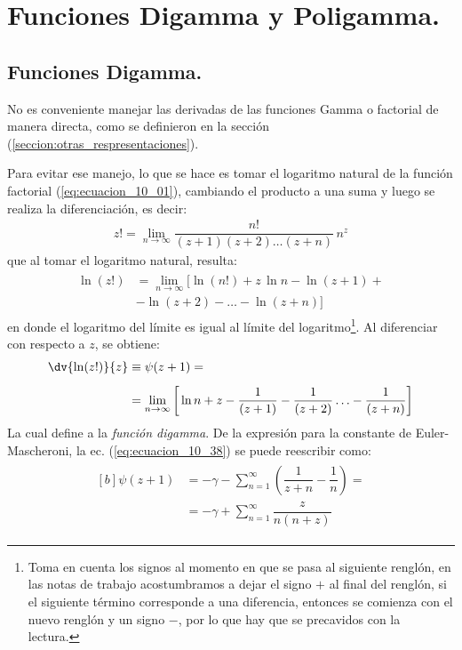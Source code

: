 \section{Funciones Digamma y Poligamma.}

\subsection{Funciones Digamma.}

No es conveniente manejar las derivadas de las funciones Gamma o factorial de manera directa, como se definieron en la sección (\ref{seccion:otras_respresentaciones}).
\par
Para evitar ese manejo, lo que se hace es tomar el logaritmo natural de la función factorial (\ref{eq:ecuacion_10_01}), cambiando el producto a una suma y luego se realiza la diferenciación, es decir:
\begin{align}
z! = \lim_{n \to \infty} \dfrac{n!}{(z + 1)(z + 2) \ldots (z + n)} \, n^{z}
\label{eq:ecuacion_10_36}
\end{align}
que al tomar el logaritmo natural, resulta:
\begin{align}
\begin{aligned}
\ln (z!) &= \lim_{n \to \infty} \big[ \ln (n!) + z \, \ln n - \ln (z + 1) + \\[0.5em]
&- \ln (z + 2) - \ldots - \ln (z + n) \big]
\end{aligned}
\label{eq:ecuacion_10_37}
\end{align}
en donde el logaritmo del límite es igual al límite del logaritmo\footnote{Toma en cuenta los signos al momento en que se pasa al siguiente renglón, en las notas de trabajo acostumbramos a dejar el signo $+$ al final del renglón, si el siguiente término corresponde a una diferencia, entonces se comienza con el nuevo renglón y un signo $-$, por lo que hay que se precavidos con la lectura.}. Al diferenciar con respecto a $z$, se obtiene:
\begin{align}
\begin{aligned}[b]
\dv{\ln (z!)}{z} &\equiv \psi(z + 1) = \\[0.5em]
&=\lim_{n \to \infty} \bigg[ \ln n + z - \dfrac{1}{(z + 1)} - \dfrac{1}{(z + 2)} \ldots - \dfrac{1}{(z + n)} \bigg]
\end{aligned}
\label{eq:ecuacion_10_38}
\end{align}
La cual define a la \emph{función digamma}. De la expresión para la constante de Euler-Mascheroni, la ec. (\ref{eq:ecuacion_10_38}) se puede reescribir como:
\begin{align}
\begin{aligned}[b]
\psi (z + 1) &= - \gamma - \sum_{n=1}^{\infty} \left( \dfrac{1}{z + n} - \dfrac{1}{n} \right) = \\[0.5em]
&= -\gamma + \sum_{n=1}^{\infty} \dfrac{z}{n (n + z)}
\end{aligned}
\label{eq:ecuacion_10_39}
\end{align}

